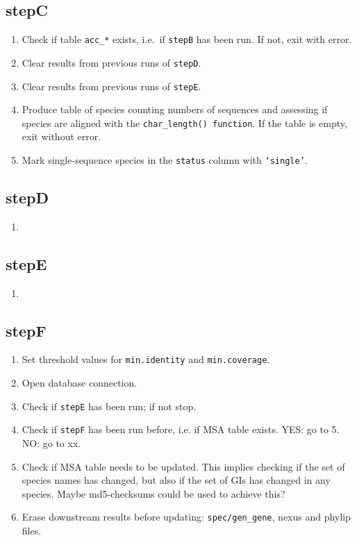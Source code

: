 \documentclass[12pt]{article}
\begin{document}
\subsection{stepC}

\begin{enumerate}
\item Check if table \texttt{acc\_*} exists, i.e.~if \texttt{stepB} has been run. If not, exit with error.
\item Clear results from previous runs of \texttt{stepD}.
\item Clear results from previous runs of \texttt{stepE}.


\item Produce table of species counting numbers of sequences and assessing if species are aligned with the \texttt{char\_length() function}. If the table is empty, exit without error.

\item Mark single-sequence species in the \texttt{status} column with \texttt{`single'}.

\end{enumerate}

\subsection{stepD}

\begin{enumerate}
\item 
\end{enumerate}

\subsection{stepE}

\begin{enumerate}
\item 
\end{enumerate}



\subsection{stepF}

\begin{enumerate}
\item Set threshold values for \texttt{min.identity} and \texttt{min.coverage}.
\item Open database connection.
\item Check if \texttt{stepE} has been run; if not stop.
\item Check if \texttt{stepF} has been run before, i.e. if MSA table exists. YES: go to 5. NO: go to xx.
\item Check if MSA table needs to be updated. This implies checking if the set of species names has changed, but also if the set of GIs has changed in any species. Maybe md5-checksums could be used to achieve this?
\item Erase downstream results before updating: \texttt{spec/gen\_gene}, nexus and phylip files.
\end{enumerate}
\end{document}
